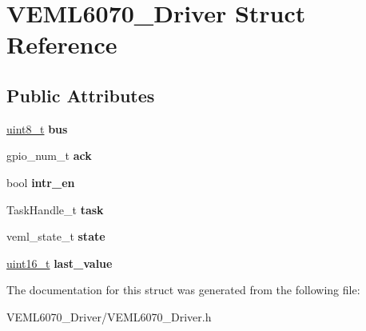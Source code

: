 \hypertarget{structVEML6070__Driver}{}\section{V\+E\+M\+L6070\+\_\+\+Driver Struct Reference}
\label{structVEML6070__Driver}
\subsection*{Public Attributes}
\begin{DoxyCompactItemize}
\item 
\mbox{\label{structVEML6070__Driver_a8efe47c65d7bf944e38fc12ec28932ec}} 
\hyperlink{vl53l0x__types_8h_aba7bc1797add20fe3efdf37ced1182c5}{uint8\+\_\+t} {\bfseries bus}
\item 
\mbox{\label{structVEML6070__Driver_af1c9e7fefec6867ce382149308ad1b6c}} 
gpio\+\_\+num\+\_\+t {\bfseries ack}
\item 
\mbox{\label{structVEML6070__Driver_a623862e8164bee7cce40d52dde10d0b3}} 
bool {\bfseries intr\+\_\+en}
\item 
\mbox{\label{structVEML6070__Driver_a087acac12be67f20a6c1e89ead639c9f}} 
Task\+Handle\+\_\+t {\bfseries task}
\item 
\mbox{\label{structVEML6070__Driver_a356684f4cd4468183ae7cd74b4e69e8a}} 
veml\+\_\+state\+\_\+t {\bfseries state}
\item 
\mbox{\label{structVEML6070__Driver_ab40a8e69273ef222a8e63e6e39cf7931}} 
\hyperlink{vl53l0x__types_8h_a273cf69d639a59973b6019625df33e30}{uint16\+\_\+t} {\bfseries last\+\_\+value}
\end{DoxyCompactItemize}


The documentation for this struct was generated from the following file\+:\begin{DoxyCompactItemize}
\item 
V\+E\+M\+L6070\+\_\+\+Driver/V\+E\+M\+L6070\+\_\+\+Driver.\+h\end{DoxyCompactItemize}
